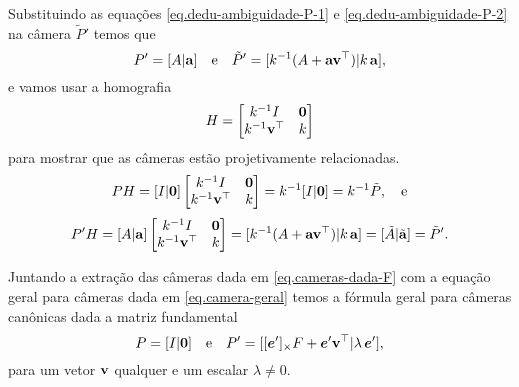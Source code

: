 Substituindo as equações \ref{eq.dedu-ambiguidade-P-1} e \ref{eq.dedu-ambiguidade-P-2} na câmera $\tilde{P}'$ temos que 
\begin{equation}\label{eq.camera-geral}
P'=[A|{\bf a}]\quad\text{e}\quad \tilde{P}'=[k^{-1}(A+{\bf a}{\bf v}^\top)|k\,{\bf a}],
\end{equation}
e vamos usar a homografia
\begin{equation*}
H=
\begin{bmatrix}
k^{-1}I&{\bf 0}\\
k^{-1}{\bf v}^\top&k
\end{bmatrix}
\end{equation*}
para mostrar que as câmeras estão projetivamente relacionadas.
\begin{equation*}
PH=[I|{\bf 0}]
\begin{bmatrix}
k^{-1}I&{\bf 0}\\
k^{-1}{\bf v}^\top&k
\end{bmatrix}
=
k^{-1}[I|{\bf 0}]=k^{-1}\tilde{P},\quad\text{e}
\end{equation*}
\begin{equation*}
P'H=[A|{\bf a}]
\begin{bmatrix}
k^{-1}I&{\bf 0}\\
k^{-1}{\bf v}^\top&k
\end{bmatrix}
=
[k^{-1}(A+{\bf a}{\bf v}^\top)|k\,{\bf a}]
=[\tilde{A}|\tilde{{\bf a}}]=\tilde{P}'.
\end{equation*}

Juntando a extração das câmeras dada em \ref{eq.cameras-dada-F} com a equação geral para câmeras dada em \ref{eq.camera-geral} temos a fórmula geral para câmeras canônicas dada a matriz fundamental
\begin{equation*}
P=[I|{\bf 0}]\quad\text{e}\quad P'=[[\boldsymbol{e}']_\times F+\boldsymbol{e}'{\bf v}^\top |\lambda\,\boldsymbol{e}'],
\end{equation*} 
para um vetor ${\bf v}$ qualquer  e um escalar $\lambda\neq0$.

